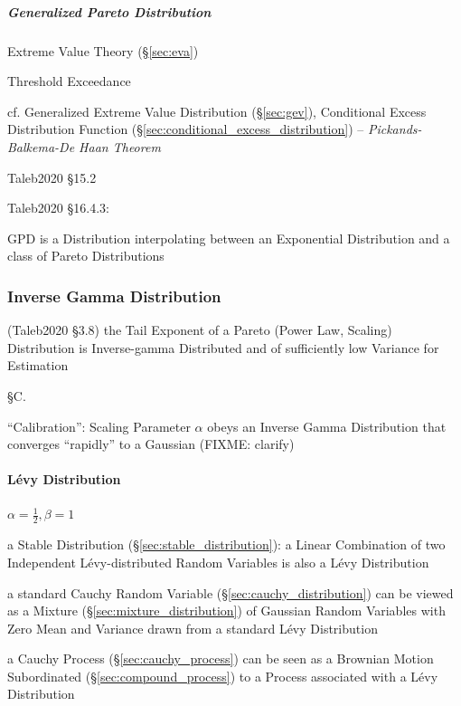 \subparagraph{Generalized Pareto Distribution}\label{sec:generalized_pareto}
\hfill

Extreme Value Theory (\S\ref{sec:eva})

Threshold Exceedance

cf. Generalized Extreme Value Distribution (\S\ref{sec:gev}),
Conditional Excess Distribution Function
(\S\ref{sec:conditional_excess_distribution}) --
\emph{Pickands-Balkema-De Haan Theorem}

Taleb2020 \S 15.2

Taleb2020 \S 16.4.3:

GPD is a Distribution interpolating between an Exponential Distribution and a
class of Pareto Distributions



\subsubsection{Inverse Gamma Distribution}\label{sec:inverse_gamma}


(Taleb2020 \S 3.8) the Tail Exponent of a Pareto (Power Law, Scaling)
Distribution is Inverse-gamma Distributed and of sufficiently low Variance for
Estimation

\S C.

``Calibration'': Scaling Parameter $\alpha$ obeys an Inverse Gamma Distribution
that converges ``rapidly'' to a Gaussian (FIXME: clarify)



\paragraph{L\'evy Distribution}\label{sec:levy_distribution}\hfill

$\alpha = \frac{1}{2}, \beta = 1$

a Stable Distribution (\S\ref{sec:stable_distribution}): a Linear Combination of
two Independent L\'evy-distributed Random Variables is also a L\'evy
Distribution

a standard Cauchy Random Variable (\S\ref{sec:cauchy_distribution}) can be
viewed as a Mixture (\S\ref{sec:mixture_distribution}) of Gaussian Random
Variables with Zero Mean and Variance drawn from a standard L\'evy Distribution

a Cauchy Process (\S\ref{sec:cauchy_process}) can be seen as a Brownian Motion
Subordinated (\S\ref{sec:compound_process}) to a Process associated with a
L\'evy Distribution



